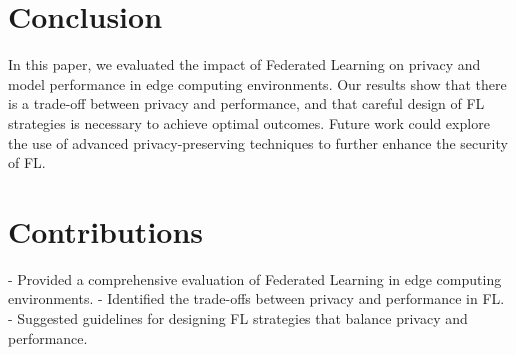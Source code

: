 \documentclass{article}
\begin{document}
\section{Conclusion}
In this paper, we evaluated the impact of Federated Learning on privacy and model performance in edge computing environments. Our results show that there is a trade-off between privacy and performance, and that careful design of FL strategies is necessary to achieve optimal outcomes. Future work could explore the use of advanced privacy-preserving techniques to further enhance the security of FL.

\section{Contributions}
- Provided a comprehensive evaluation of Federated Learning in edge computing environments.
- Identified the trade-offs between privacy and performance in FL.
- Suggested guidelines for designing FL strategies that balance privacy and performance.
\end{document}
